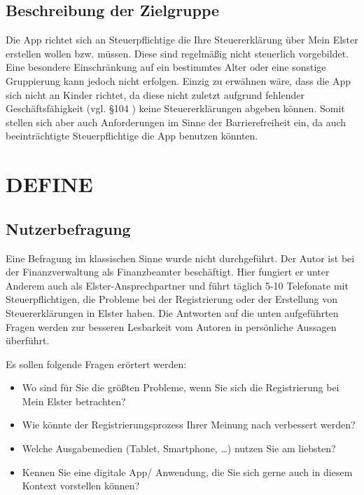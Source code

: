 \subsection{Beschreibung der Zielgruppe}\label{Beschreibung der Zielgruppe}
Die App richtet sich an Steuerpflichtige die Ihre Steuererklärung über \grq{}Mein Elster\grq{} erstellen wollen bzw. müssen.
Diese sind regelmäßig nicht steuerlich vorgebildet. Eine besondere Einschränkung auf ein bestimmtes Alter oder eine sonstige Gruppierung kann jedoch nicht erfolgen. Einzig zu erwähnen wäre, dass die App sich nicht an Kinder richtet, da diese nicht zuletzt aufgrund fehlender Geschäftsfähigkeit (vgl. §104 \cite{bgb}) keine Steuererklärungen abgeben können. Somit stellen sich aber auch Anforderungen im Sinne der Barrierefreiheit ein, da auch beeinträchtigte Steuerpflichtige die App benutzen könnten.


\section{DEFINE}\label{DEFINE}


\subsection{Nutzerbefragung}%

Eine Befragung im klassischen Sinne wurde nicht durchgeführt. Der Autor ist bei der Finanzverwaltung als Finanzbeamter beschäftigt. Hier fungiert er unter Anderem auch als Elster-Ansprechpartner und führt täglich 5-10 Telefonate mit Steuerpflichtigen, die Probleme bei der Registrierung oder der Erstellung von Steuererklärungen in Elster haben. Die Antworten auf die unten aufgeführten Fragen werden zur besseren Lesbarkeit vom Autoren in persönliche Aussagen überführt.

Es sollen folgende Fragen erörtert werden:
\begin{itemize}
\item Wo sind für Sie die größten Probleme, wenn Sie sich die Registrierung bei \grq{}Mein Elster\grq{} betrachten?

\item Wie könnte der Registrierungsprozess Ihrer Meinung nach verbessert werden?

\item Welche Ausgabemedien (Tablet, Smartphone, …) nutzen Sie am liebsten?

\item Kennen Sie eine digitale App/ Anwendung, die Sie sich gerne auch in diesem Kontext vorstellen können?

\end{itemize}


